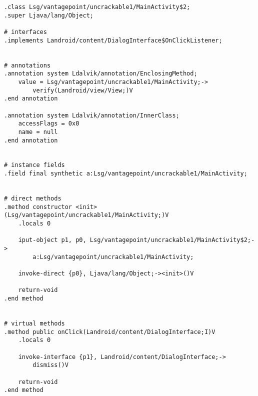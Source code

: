 \begin{verbatim}
.class Lsg/vantagepoint/uncrackable1/MainActivity$2;
.super Ljava/lang/Object;

# interfaces
.implements Landroid/content/DialogInterface$OnClickListener;


# annotations
.annotation system Ldalvik/annotation/EnclosingMethod;
    value = Lsg/vantagepoint/uncrackable1/MainActivity;->
        verify(Landroid/view/View;)V
.end annotation

.annotation system Ldalvik/annotation/InnerClass;
    accessFlags = 0x0
    name = null
.end annotation


# instance fields
.field final synthetic a:Lsg/vantagepoint/uncrackable1/MainActivity;


# direct methods
.method constructor <init>(Lsg/vantagepoint/uncrackable1/MainActivity;)V
    .locals 0

    iput-object p1, p0, Lsg/vantagepoint/uncrackable1/MainActivity$2;->
        a:Lsg/vantagepoint/uncrackable1/MainActivity;

    invoke-direct {p0}, Ljava/lang/Object;-><init>()V

    return-void
.end method


# virtual methods
.method public onClick(Landroid/content/DialogInterface;I)V
    .locals 0

    invoke-interface {p1}, Landroid/content/DialogInterface;->
        dismiss()V

    return-void
.end method
\end{verbatim}
